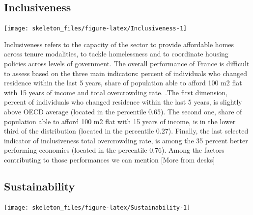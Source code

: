 \documentclass[]{article}
\begin{document}
\begin{multicols}{3}
\color{ProcessBlue}
\begin{center}
\section{Inclusiveness}
\end{center}

\color{black}


\begin{center}\texttt{[image: skeleton\_files/figure-latex/Inclusiveness-1]} \end{center}





Inclusiveness refers to the capacity of the sector to provide affordable homes across tenure modalities,             to tackle homelessness and to coordinate housing policies across levels of government. The overall performance of France is difficult to assess based on the three main indicators: percent of individuals who changed residence within the last 5 years, share of population able to afford 100 m2 flat with 15 years of income and total overcrowding rate. .The first dimension, percent of individuals who changed residence within the last 5 years, is slightly above OECD average (located in the percentile 0.65). The second one, share of population able to afford 100 m2 flat with 15 years of income, is in the lower third of the distribution (located in the percentile 0.27). Finally, the last selected indicator of inclusiveness total overcrowding rate, is among the 35 percent better performing economies (located in the percentile 0.76). Among the factors contributing to those performances we can mention [More from desks]

\columnbreak

\color{Green}

\begin{center}
\section{Sustainability}
\end{center}

\color{black}


\begin{center}\texttt{[image: skeleton\_files/figure-latex/Sustainability-1]} \end{center}






\end{multicols}
\end{document}
